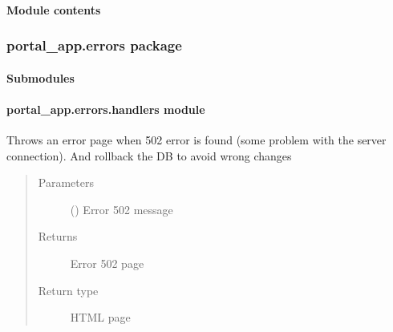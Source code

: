 \documentclass[letterpaper,10pt,english]{sphinxmanual}
\begin{document}
\paragraph{Module contents}
\label{\detokenize{CE_app.auth:module-CE_app.auth}}\label{\detokenize{CE_app.auth:module-contents}}

\subsubsection{portal\_app.errors package}
\label{\detokenize{CE_app.errors:portal-app-errors-package}}\label{\detokenize{CE_app.errors::doc}}

\paragraph{Submodules}
\label{\detokenize{CE_app.errors:submodules}}

\paragraph{portal\_app.errors.handlers module}
\label{\detokenize{CE_app.errors:module-CE_app.errors.handlers}}\label{\detokenize{CE_app.errors:portal-app-errors-handlers-module}}

\begin{fulllineitems}
\label{\detokenize{CE_app.errors:CE_app.errors.handlers.internal_error}}
\sphinxAtStartPar
Throws an error page when 502 error is found (some problem with the server connection). And rollback the DB to avoid wrong changes
\begin{quote}\begin{description}
\item[{Parameters}] \leavevmode
\sphinxAtStartPar
{} () \textendash{} Error 502 message

\item[{Returns}] \leavevmode
\sphinxAtStartPar
Error 502 page

\item[{Return type}] \leavevmode
\sphinxAtStartPar
HTML page

\end{description}\end{quote}

\end{fulllineitems}
\end{document}
